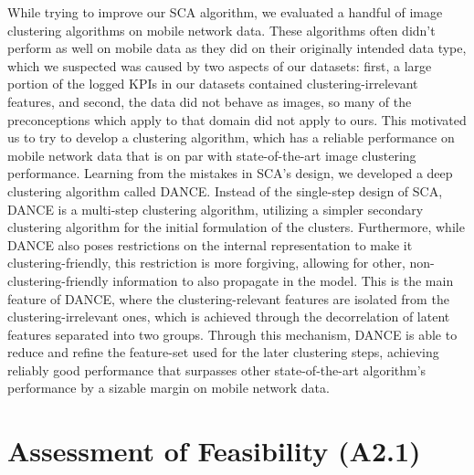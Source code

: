 	While trying to improve our \ac{SCA} algorithm, we evaluated a handful of image clustering algorithms on mobile network data.
	These algorithms often didn't perform as well on mobile data as they did on their originally intended data type, which we suspected was caused by two aspects of our datasets: first, a large portion of the logged \acp{KPI} in our datasets contained clustering-irrelevant features, and second, the data did not behave as images, so many of the preconceptions which apply to that domain did not apply to ours.
	This motivated us to try to develop a clustering algorithm, which has a reliable performance on mobile network data that is on par with state-of-the-art image clustering performance.
	Learning from the mistakes in \ac{SCA}'s design, we developed a deep clustering algorithm called \ac{DANCE}.
	Instead of the single-step design of \ac{SCA}, \ac{DANCE} is a multi-step clustering algorithm, utilizing a simpler secondary clustering algorithm for the initial formulation of the clusters.
	Furthermore, while \ac{DANCE} also poses restrictions on the internal representation to make it clustering-friendly, this restriction is more forgiving, allowing for other, non-clustering-friendly information to also propagate in the model.
	This is the main feature of \ac{DANCE}, where the clustering-relevant features are isolated from the clustering-irrelevant ones, which is achieved through the decorrelation of latent features separated into two groups.
	Through this mechanism, \ac{DANCE} is able to reduce and refine the feature-set used for the later clustering steps, achieving reliably good performance that surpasses other state-of-the-art algorithm's performance by a sizable margin on mobile network data.
	
	
	\section{Assessment of Feasibility (A2.1)}
	
